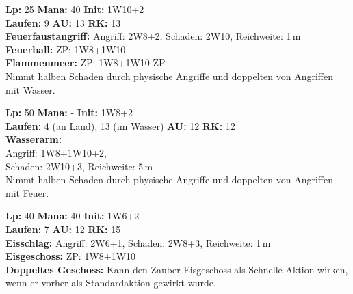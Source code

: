 \documentclass[../../Heldenanleitung2]{subfiles}
\begin{document}
\begin{multicols}{2}

\begin{tcolorbox}[title={Feuerelementar},colbacktitle=red, coltitle=black]    
   \textbf{Lp:} 25
   \textbf{Mana:} 40
   \textbf{Init:} 1W10+2\\
   \textbf{Laufen:} 9
   \textbf{AU:} 13
   \textbf{RK:} 13\\
   
   \textbf{Feuerfaustangriff:} Angriff: 2W8+2, Schaden: 2W10, Reichweite: 1\,m\\
   
   \textbf{Feuerball:} ZP: 1W8+1W10\\
   
   \textbf{Flammenmeer:} ZP: 1W8+1W10 ZP\\
   
   Nimmt halben Schaden durch physische Angriffe und doppelten von Angriffen mit Wasser.
\end{tcolorbox}

\begin{tcolorbox}[title={Wasserelementar},colbacktitle=blue, coltitle=white]    
   \textbf{Lp:} 50
   \textbf{Mana:} -
   \textbf{Init:} 1W8+2\\
   \textbf{Laufen:} 4 (an Land), 13 (im Wasser)
   \textbf{AU:} 12
   \textbf{RK:} 12\\
   
   \textbf{Wasserarm:}\\ Angriff: 1W8+1W10+2, \\Schaden: 2W10+3, Reichweite: 5\,m\\
   
   Nimmt halben Schaden durch physische Angriffe und doppelten von Angriffen mit Feuer.
\end{tcolorbox}

\begin{tcolorbox}[title={Eiselementar},colbacktitle=cyan, coltitle=black]    
   \textbf{Lp:} 40
   \textbf{Mana:} 40
   \textbf{Init:} 1W6+2\\
   \textbf{Laufen:} 7
   \textbf{AU:} 12
   \textbf{RK:} 15\\
   
   \textbf{Eisschlag:} Angriff: 2W6+1, Schaden: 2W8+3, Reichweite: 1\,m\\
   
   \textbf{Eisgeschoss:} ZP: 1W8+1W10\\
   
   \textbf{Doppeltes Geschoss:} Kann den Zauber Eisgeschoss als Schnelle Aktion wirken, wenn er vorher als Standardaktion gewirkt wurde.
\end{tcolorbox}


\end{multicols}
\end{document}
